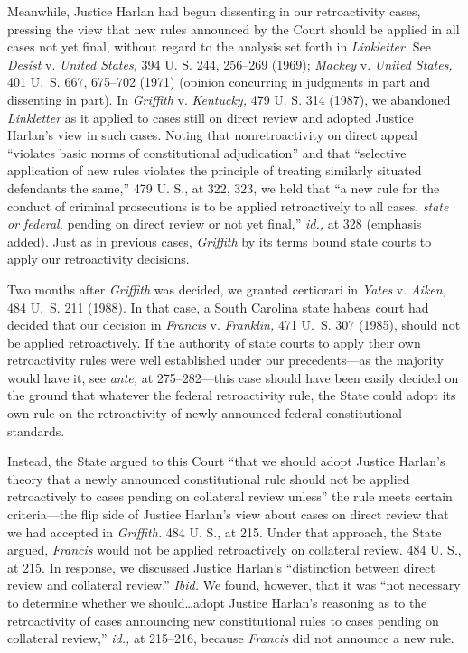   Meanwhile, Justice Harlan had begun dissenting in our retroactivity cases, pressing the view that new rules announced by the Court should be applied in all cases not yet final, without regard to the analysis set forth in \emph{Linkletter.} See \emph{Desist} v. \emph{United States,} 394 U. S. 244, 256--269 (1969); \emph{Mackey} v. \emph{United States,} 401 U.~S. 667, 675--702 (1971) (opinion concurring in judgments in part and dissenting in part). In \emph{Griffith} v. \emph{Kentucky,} 479 U. S. 314 (1987), we abandoned \emph{Linkletter} as it applied to cases still on direct review and adopted Justice Harlan's view in such cases. Noting that nonretroactivity on direct appeal ``violates basic norms of constitutional adjudication'' and that ``selective application of new rules violates the principle of treating similarly situated defendants the same,'' 479 U. S., at 322, 323, we held that ``a new rule for the conduct of criminal prosecutions is to be applied retroactively to all cases, \emph{state or federal,} pending on direct review or not yet final,'' \emph{id.,} at 328 (emphasis added). Just as in previous cases, \emph{Griffith} by its terms bound state courts to apply our retroactivity decisions.

  Two months after \emph{Griffith} was decided, we granted certiorari in \emph{Yates} v. \emph{Aiken,} 484 U.~S. 211 (1988). In that case, a \newpage  South Carolina state habeas court had decided that our decision in \emph{Francis} v. \emph{Franklin,} 471 U.~S. 307 (1985), should not be applied retroactively. If the authority of state courts to apply their own retroactivity rules were well established under our precedents---as the majority would have it, see \emph{ante,} at 275--282---this case should have been easily decided on the ground that whatever the federal retroactivity rule, the State could adopt its own rule on the retroactivity of newly announced federal constitutional standards.

  Instead, the State argued to this Court ``that we should adopt Justice Harlan's theory that a newly announced constitutional rule should not be applied retroactively to cases pending on collateral review unless'' the rule meets certain criteria---the flip side of Justice Harlan's view about cases on direct review that we had accepted in \emph{Griffith.} 484 U. S., at 215. Under that approach, the State argued, \emph{Francis} would not be applied retroactively on collateral review. 484 U. S., at 215. In response, we discussed Justice Harlan's ``distinction between direct review and collateral review.'' \emph{Ibid.} We found, however, that it was ``not necessary to determine whether we should\dots adopt Justice Harlan's reasoning as to the retroactivity of cases announcing new constitutional rules to cases pending on collateral review,'' \emph{id.,} at 215--216, because \emph{Francis} did not announce a new rule.

